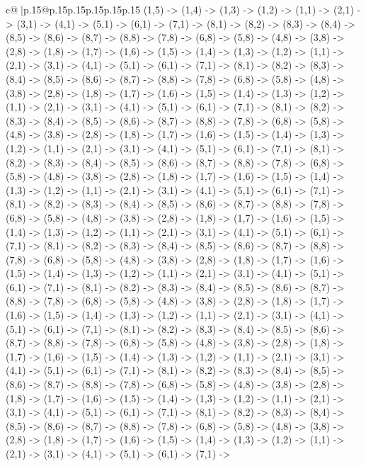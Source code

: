\documentclass{article}
\begin{document}
{\begin{supertabular}{c@{$\;$}|p{.15\linewidth}@{}p{.15\linewidth}p{.15\linewidth}p{.15\linewidth}p{.15\linewidth}p{.15\linewidth}}
{{{(1,5) {-}> (1,4) {-}> (1,3) {-}> (1,2) {-}> (1,1) {-}> (2,1) {-}> (3,1) {-}> (4,1) {-}> (5,1) {-}> (6,1) {-}> (7,1) {-}> (8,1) {-}> (8,2) {-}> (8,3) {-}> (8,4) {-}> (8,5) {-}> (8,6) {-}> (8,7) {-}> (8,8) {-}> (7,8) {-}> (6,8) {-}> (5,8) {-}> (4,8) {-}> (3,8) {-}> (2,8) {-}> (1,8) {-}> (1,7) {-}> (1,6) {-}> (1,5) {-}> (1,4) {-}> (1,3) {-}> (1,2) {-}> (1,1) {-}> (2,1) {-}> (3,1) {-}> (4,1) {-}> (5,1) {-}> (6,1) {-}> (7,1) {-}> (8,1) {-}> (8,2) {-}> (8,3) {-}> (8,4) {-}> (8,5) {-}> (8,6) {-}> (8,7) {-}> (8,8) {-}> (7,8) {-}> (6,8) {-}> (5,8) {-}> (4,8) {-}> (3,8) {-}> (2,8) {-}> (1,8) {-}> (1,7) {-}> (1,6) {-}> (1,5) {-}> (1,4) {-}> (1,3) {-}> (1,2) {-}> (1,1) {-}> (2,1) {-}> (3,1) {-}> (4,1) {-}> (5,1) {-}> (6,1) {-}> (7,1) {-}> (8,1) {-}> (8,2) {-}> (8,3) {-}> (8,4) {-}> (8,5) {-}> (8,6) {-}> (8,7) {-}> (8,8) {-}> (7,8) {-}> (6,8) {-}> (5,8) {-}> (4,8) {-}> (3,8) {-}> (2,8) {-}> (1,8) {-}> (1,7) {-}> (1,6) {-}> (1,5) {-}> (1,4) {-}> (1,3) {-}> (1,2) {-}> (1,1) {-}> (2,1) {-}> (3,1) {-}> (4,1) {-}> (5,1) {-}> (6,1) {-}> (7,1) {-}> (8,1) {-}> (8,2) {-}> (8,3) {-}> (8,4) {-}> (8,5) {-}> (8,6) {-}> (8,7) {-}> (8,8) {-}> (7,8) {-}> (6,8) {-}> (5,8) {-}> (4,8) {-}> (3,8) {-}> (2,8) {-}> (1,8) {-}> (1,7) {-}> (1,6) {-}> (1,5) {-}> (1,4) {-}> (1,3) {-}> (1,2) {-}> (1,1) {-}> (2,1) {-}> (3,1) {-}> (4,1) {-}> (5,1) {-}> (6,1) {-}> (7,1) {-}> (8,1) {-}> (8,2) {-}> (8,3) {-}> (8,4) {-}> (8,5) {-}> (8,6) {-}> (8,7) {-}> (8,8) {-}> (7,8) {-}> (6,8) {-}> (5,8) {-}> (4,8) {-}> (3,8) {-}> (2,8) {-}> (1,8) {-}> (1,7) {-}> (1,6) {-}> (1,5) {-}> (1,4) {-}> (1,3) {-}> (1,2) {-}> (1,1) {-}> (2,1) {-}> (3,1) {-}> (4,1) {-}> (5,1) {-}> (6,1) {-}> (7,1) {-}> (8,1) {-}> (8,2) {-}> (8,3) {-}> (8,4) {-}> (8,5) {-}> (8,6) {-}> (8,7) {-}> (8,8) {-}> (7,8) {-}> (6,8) {-}> (5,8) {-}> (4,8) {-}> (3,8) {-}> (2,8) {-}> (1,8) {-}> (1,7) {-}> (1,6) {-}> (1,5) {-}> (1,4) {-}> (1,3) {-}> (1,2) {-}> (1,1) {-}> (2,1) {-}> (3,1) {-}> (4,1) {-}> (5,1) {-}> (6,1) {-}> (7,1) {-}> (8,1) {-}> (8,2) {-}> (8,3) {-}> (8,4) {-}> (8,5) {-}> (8,6) {-}> (8,7) {-}> (8,8) {-}> (7,8) {-}> (6,8) {-}> (5,8) {-}> (4,8) {-}> (3,8) {-}> (2,8) {-}> (1,8) {-}> (1,7) {-}> (1,6) {-}> (1,5) {-}> (1,4) {-}> (1,3) {-}> (1,2) {-}> (1,1) {-}> (2,1) {-}> (3,1) {-}> (4,1) {-}> (5,1) {-}> (6,1) {-}> (7,1) {-}> (8,1) {-}> (8,2) {-}> (8,3) {-}> (8,4) {-}> (8,5) {-}> (8,6) {-}> (8,7) {-}> (8,8) {-}> (7,8) {-}> (6,8) {-}> (5,8) {-}> (4,8) {-}> (3,8) {-}> (2,8) {-}> (1,8) {-}> (1,7) {-}> (1,6) {-}> (1,5) {-}> (1,4) {-}> (1,3) {-}> (1,2) {-}> (1,1) {-}> (2,1) {-}> (3,1) {-}> (4,1) {-}> (5,1) {-}> (6,1) {-}> (7,1) {-}> (8,1) {-}> (8,2) {-}> (8,3) {-}> (8,4) {-}> (8,5) {-}> (8,6) {-}> (8,7) {-}> (8,8) {-}> (7,8) {-}> (6,8) {-}> (5,8) {-}> (4,8) {-}> (3,8) {-}> (2,8) {-}> (1,8) {-}> (1,7) {-}> (1,6) {-}> (1,5) {-}> (1,4) {-}> (1,3) {-}> (1,2) {-}> (1,1) {-}> (2,1) {-}> (3,1) {-}> (4,1) {-}> (5,1) {-}> (6,1) {-}> (7,1) {-}> (8,1) {-}> (8,2) {-}> (8,3) {-}> (8,4) {-}> (8,5) {-}> (8,6) {-}> (8,7) {-}> (8,8) {-}> (7,8) {-}> (6,8) {-}> (5,8) {-}> (4,8) {-}> (3,8) {-}> (2,8) {-}> (1,8) {-}> (1,7) {-}> (1,6) {-}> (1,5) {-}> (1,4) {-}> (1,3) {-}> (1,2) {-}> (1,1) {-}> (2,1) {-}> (3,1) {-}> (4,1) {-}> (5,1) {-}> (6,1) {-}> (7,1) {-}> }}}
\end{supertabular}}
\end{document}
